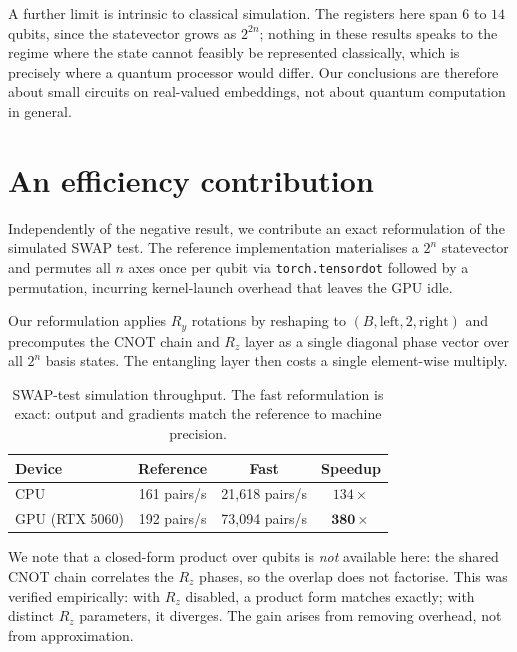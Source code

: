 \documentclass[preprint,12pt]{elsarticle}
\begin{document}
A further limit is intrinsic to classical simulation. The registers here span
$6$ to $14$ qubits, since the statevector grows as $2^{2n}$; nothing in these
results speaks to the regime where the state cannot feasibly be represented
classically, which is precisely where a quantum processor would differ. Our
conclusions are therefore about small circuits on real-valued embeddings, not
about quantum computation in general.

\section{An efficiency contribution}
\label{sec:efficiency}

Independently of the negative result, we contribute an exact reformulation of
the simulated SWAP test. The reference implementation materialises a $2^n$
statevector and permutes all $n$ axes once per qubit via
\texttt{torch.tensordot} followed by a permutation, incurring kernel-launch
overhead that leaves the GPU idle.

Our reformulation applies $R_y$ rotations by reshaping to
$(B, \text{left}, 2, \text{right})$ and precomputes the CNOT chain and $R_z$
layer as a single diagonal phase vector over all $2^n$ basis states. The
entangling layer then costs a single element-wise multiply.

\begin{table}[t]
\caption{SWAP-test simulation throughput. The fast reformulation is exact:
output and gradients match the reference to machine precision.}
\label{tab:speedup}
\centering
\begin{tabular}{@{}lccc@{}}
\toprule
Device & Reference & Fast & Speedup \\
\midrule
CPU & 161 pairs/s & 21{,}618 pairs/s & $134\times$ \\
GPU (RTX 5060) & 192 pairs/s & 73{,}094 pairs/s & $\mathbf{380\times}$ \\
\bottomrule
\end{tabular}
\end{table}

We note that a closed-form product over qubits is \emph{not} available here:
the shared CNOT chain correlates the $R_z$ phases, so the overlap does not
factorise. This was verified empirically: with $R_z$ disabled, a product form
matches exactly; with distinct $R_z$ parameters, it diverges. The gain
arises from removing overhead, not from approximation.
\end{document}
